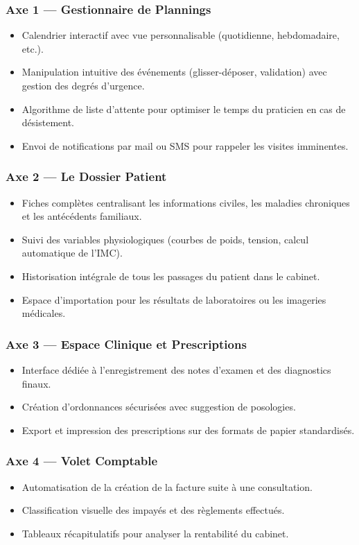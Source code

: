 \documentclass[final]{report}
\begin{document}
\subsubsection*{Axe 1 — Gestionnaire de Plannings}
\begin{itemize}
  \item Calendrier interactif avec vue personnalisable (quotidienne, hebdomadaire, etc.).
  \item Manipulation intuitive des événements (glisser-déposer, validation) avec gestion des degrés d'urgence.
  \item Algorithme de liste d'attente pour optimiser le temps du praticien en cas de désistement.
  \item Envoi de notifications par mail ou SMS pour rappeler les visites imminentes.
\end{itemize}
 
\subsubsection*{Axe 2 — Le Dossier Patient}
\begin{itemize}
  \item Fiches complètes centralisant les informations civiles, les maladies chroniques et les antécédents familiaux.
  \item Suivi des variables physiologiques (courbes de poids, tension, calcul automatique de l'IMC).
  \item Historisation intégrale de tous les passages du patient dans le cabinet.
  \item Espace d'importation pour les résultats de laboratoires ou les imageries médicales.
\end{itemize}
 
\subsubsection*{Axe 3 — Espace Clinique et Prescriptions}
\begin{itemize}
  \item Interface dédiée à l'enregistrement des notes d'examen et des diagnostics finaux.
  \item Création d'ordonnances sécurisées avec suggestion de posologies.
  \item Export et impression des prescriptions sur des formats de papier standardisés.
\end{itemize}
 
\subsubsection*{Axe 4 — Volet Comptable}
\begin{itemize}
  \item Automatisation de la création de la facture suite à une consultation.
  \item Classification visuelle des impayés et des règlements effectués.
  \item Tableaux récapitulatifs pour analyser la rentabilité du cabinet.
\end{itemize}
 
\end{document}
